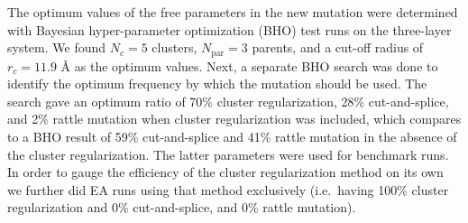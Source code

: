 \documentclass[aip,amsmath,amssymb,reprint]{revtex4-1}
\begin{document}
The optimum values of the free parameters in the new mutation were
determined with Bayesian hyper-parameter optimization (BHO) test runs on the three-layer system. We found $N_c=5$ clusters, $N_\mathrm{par}=3$
parents, and a cut-off radius of $r_c=11.9$ {\AA} as the optimum
values. Next, a separate BHO search was done to identify the optimum
frequency by which the mutation should be used. The search gave an
optimum ratio of 70\% cluster regularization, 28\% cut-and-splice, and 2\%
rattle mutation when cluster regularization was included, which
compares to a BHO result of 59\% cut-and-splice and
41\% rattle mutation in the absence of the cluster regularization. The
latter parameters were used for benchmark runs. In order to gauge the efficiency of
the cluster regularization method on its own we further did EA runs
using that method exclusively (i.e.\ having 100\% cluster
regularization and 0\% cut-and-splice, and 0\% rattle mutation).
\end{document}
